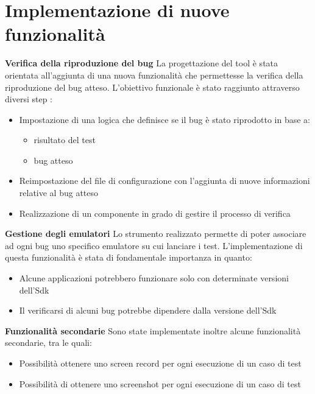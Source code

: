 \section{Implementazione di nuove funzionalità}
\textbf{Verifica della riproduzione del bug} \newline
La progettazione del tool è stata orientata all'aggiunta di una nuova funzionalità che permettesse la verifica della riproduzione del bug atteso. L'obiettivo funzionale è stato raggiunto attraverso diversi step :
\begin{itemize} [nosep]
\item Impostazione di una logica che definisce se il bug è stato riprodotto in base a:
\begin{itemize} [nosep]
\item risultato del test
\item bug atteso
\end{itemize}
\item Reimpostazione del file di configurazione con l'aggiunta di nuove informazioni relative al bug atteso
\item Realizzazione di un componente in grado di gestire il processo di verifica
\end{itemize}
\bigskip
\noindent\textbf{Gestione degli emulatori} \newline
\noindent Lo strumento realizzato permette di poter associare ad ogni bug uno specifico emulatore su cui lanciare i test. L'implementazione di questa funzionalità è stata di fondamentale importanza in quanto:
\begin{itemize}[nosep]
\item Alcune applicazioni potrebbero funzionare solo con determinate versioni dell'Sdk
\item Il verificarsi di alcuni bug potrebbe dipendere dalla versione dell'Sdk
\end{itemize}
\bigskip
\noindent\textbf{Funzionalità secondarie} \newline
\noindent Sono state implementate inoltre alcune funzionalità secondarie, tra le quali:
\begin{itemize} [nosep]
\item Possibilità ottenere uno screen record per ogni esecuzione di un caso di test
\item Possibilità di ottenere uno screenshot per ogni esecuzione di un caso di test
\end{itemize}
\newpage
